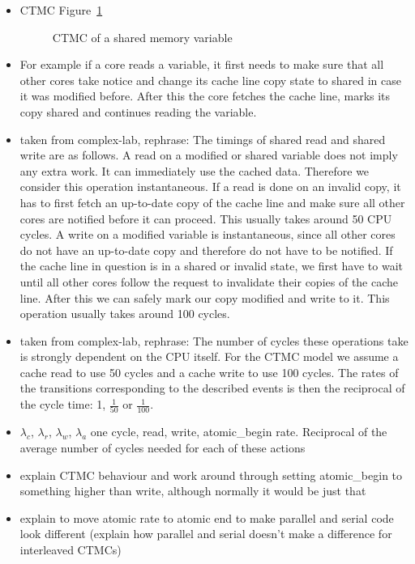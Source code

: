 \documentclass[a4paper, 10pt]{article}
\begin{document}
\begin{itemize}
	\item CTMC Figure~\ref{fig:model-shared-memory}
		\begin{figure}[htbp]
			\centering
			
			\caption{CTMC of a shared memory variable}
			\label{fig:model-shared-memory}
		\end{figure}
	\item For example if a core reads a variable, it first needs to make sure that all other cores take notice and change its cache line copy state to shared in case it was modified before. After this the core fetches the cache line, marks its copy shared and continues reading the variable.
	\item taken from complex-lab, rephrase: The timings of shared read and shared write are as follows. A read on a modified or shared variable does not imply any extra work. It can immediately use the cached data. Therefore we consider this operation instantaneous. If a read is done on an invalid copy, it has to first fetch an up-to-date copy of the cache line and make sure all other cores are notified before it can proceed. This usually takes around 50 CPU cycles. A write on a modified variable is instantaneous, since all other cores do not have an up-to-date copy and therefore do not have to be notified. If the cache line in question is in a shared or invalid state, we first have to wait until all other cores follow the request to invalidate their copies of the cache line. After this we can safely mark our copy modified and write to it. This operation usually takes around 100 cycles.
	\item taken from complex-lab, rephrase: The number of cycles these operations take is strongly dependent on the CPU itself. For the CTMC model we assume a cache read to use 50 cycles and a cache write to use 100 cycles. The rates of the transitions corresponding to the described events is then the reciprocal of the cycle time: 1, $\frac{1}{50}$ or $\frac{1}{100}$.
	\item $\lambda_c$, $\lambda_r$, $\lambda_w$, $\lambda_a$ one cycle, read, write, atomic\_begin rate. Reciprocal of the average number of cycles needed for each of these actions
	\item explain CTMC behaviour and work around through setting atomic\_begin to something higher than write, although normally it would be just that
	\item explain to move atomic rate to atomic end to make parallel and serial code look different (explain how parallel and serial doesn't make a difference for interleaved CTMCs)
\end{itemize}
\end{document}
